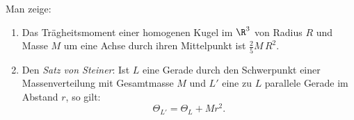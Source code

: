             \begin{prob}
%
Man zeige:
\begin{enumerate}[label = (\alph*)]
	\item Das Tr\"agheitsmoment einer homogenen Kugel im $\R^3$ von Radius $R$ und
	Masse $M$ um eine Achse durch ihren Mittelpunkt ist $\frac{2}{5} M \, R^2$.
	\item Den {\em Satz von Steiner}: Ist $L$ eine Gerade durch den
	Schwerpunkt einer Massenverteilung mit Gesamtmasse $M$ und $L'$ eine
	zu $L$ parallele Gerade im Abstand $r$, so gilt:
	$$
	\Theta_{L'} = \Theta_L + Mr^2.   
	$$
\end{enumerate}

\vspace{2mm}
            \end{prob}
